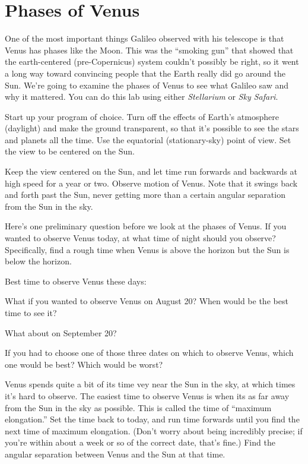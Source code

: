 \section{Phases of Venus}


One of the most important things Galileo observed with his telescope is that
Venus has phases like the Moon.   This was the ``smoking gun'' that showed
that the earth-centered (pre-Copernicus) system couldn't possibly be right,
so it went a long way toward convincing people that the Earth really did
go around the Sun.  We're going to examine the phases of Venus to see what
Galileo saw and why it mattered. You can do this lab using either
\textit{Stellarium} or \textit{Sky Safari}.

Start up your program of choice.
Turn off 
the effects of Earth's atmosphere (daylight) and 
make the ground transparent,
so that it's possible to see the stars and planets all the time.
Use the equatorial (stationary-sky) point of view.
Set the view to be centered on the Sun.

Keep the view centered on the Sun, and let time run forwards and backwards 
at high speed for a year or two.
Observe
motion of Venus.  Note that it swings back and forth past the Sun,
never getting more than a certain angular separation from the Sun in the sky.

Here's one preliminary question before we look at the phases of Venus.  If
you wanted to observe Venus today, at what time of night should you observe?
Specifically, find a rough time when Venus is above the horizon but the Sun
is below the horizon.  

Best time to observe Venus these days:

\answerspace{0.7in}

What if you wanted to observe Venus on August 20? When would be the
best time to see it?

\answerspace{0.7in}

What about on September 20?

\answerspace{0.7in}


If you had to choose one of those three dates on which to observe
Venus, which one would be best? Which would be worst?

\answerspace{0.7in}

Venus spends quite a bit of its time vey near the Sun in the sky,
at which times it's hard to observe.
The easiest time to observe Venus is when its as far away from
the Sun in the sky as possible.  This is called the time of ``maximum
elongation.''  Set the time back to today, 
and run time forwards until you find the next time of maximum
elongation.  (Don't worry about being incredibly precise; if you're
within about a week or so of the correct date, that's fine.)
Find the angular
separation between
Venus and the Sun at that time. 

